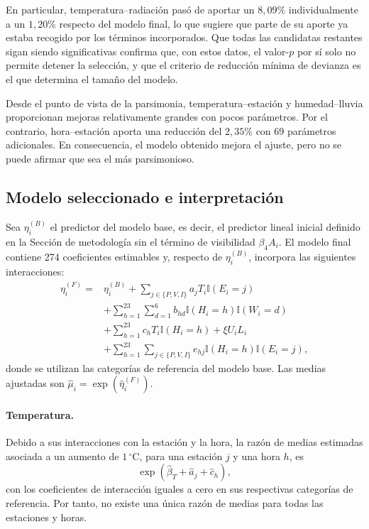 \documentclass[12pt, a4paper]{article}
\numberwithin{equation}{section}
\begin{document}
En particular, temperatura--radiación pasó de aportar un $8{,}09\%$ individualmente a un $1{,}20\%$ respecto del modelo final, lo que sugiere que parte de su aporte ya estaba recogido por los términos incorporados. Que todas las candidatas restantes sigan siendo significativas confirma que, con estos datos, el valor-$p$ por sí solo no permite detener la selección, y que el criterio de reducción mínima de devianza es el que determina el tamaño del modelo.

Desde el punto de vista de la parsimonia, temperatura--estación y humedad--lluvia proporcionan mejoras relativamente grandes con pocos parámetros. Por el contrario, hora--estación aporta una reducción del $2{,}35\%$ con 69 parámetros adicionales. En consecuencia, el modelo obtenido mejora el ajuste, pero no se puede afirmar que sea el más parsimonioso.

\newpage

\subsection{Modelo seleccionado e interpretación}

Sea $\eta_i^{(B)}$ el predictor del modelo base, es decir, el predictor lineal inicial definido en la Sección de metodología sin el término de visibilidad $\beta_4A_i$. El modelo final contiene 274 coeficientes estimables y, respecto de $\eta_i^{(B)}$, incorpora las siguientes interacciones:
\begin{align*}
\eta_i^{(F)}={}&\eta_i^{(B)}
+\sum_{j\in\{P,V,I\}} a_j T_i\mathbb{I}(E_i=j)\\
&+\sum_{h=1}^{23}\sum_{d=1}^{6} b_{hd}\mathbb{I}(H_i=h)\mathbb{I}(W_i=d)\\
&+\sum_{h=1}^{23} c_h T_i\mathbb{I}(H_i=h)+\xi U_iL_i\\
&+\sum_{h=1}^{23}\sum_{j\in\{P,V,I\}} e_{hj}\mathbb{I}(H_i=h)\mathbb{I}(E_i=j),
\end{align*}
donde se utilizan las categorías de referencia del modelo base. Las medias ajustadas son $\widehat\mu_i=\exp(\widehat\eta_i^{(F)})$.

\paragraph{Temperatura.} Debido a sus interacciones con la estación y la hora, la razón de medias estimadas asociada a un aumento de $1\,^{\circ}$C, para una estación $j$ y una hora $h$, es
\[
\exp(\widehat\beta_T+\widehat a_j+\widehat c_h),
\]
con los coeficientes de interacción iguales a cero en sus respectivas categorías de referencia. Por tanto, no existe una única razón de medias para todas las estaciones y horas.
\end{document}
